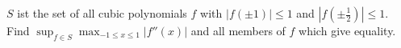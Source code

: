 \(S\) ist the set of all cubic polynomials \(f\) with \(|f(\pm 1)| \leq 1\) and \(|f(\pm \frac{1}{2})| \leq 1\). Find \(\sup_{f \in S} \max_{-1 \leq x \leq 1} |f''(x)|\) and all members of \(f\) which give equality.